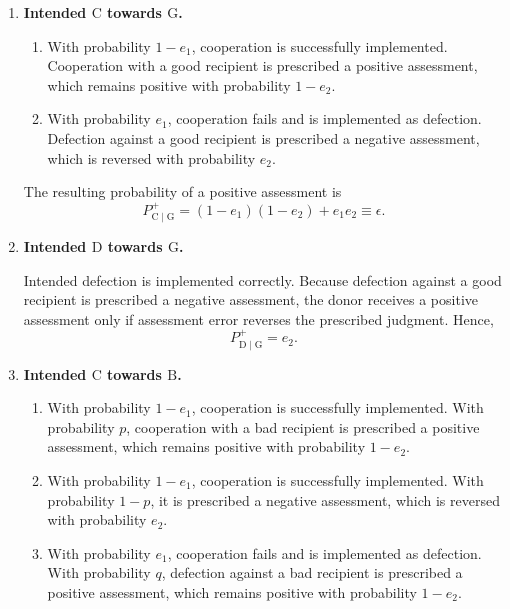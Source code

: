 \documentclass[fleqn,10pt]{wlscirep}
\begin{document}
\begin{enumerate}
\item \textbf{Intended $\mathrm{C}$ towards $\mathrm{G}$.}
\begin{enumerate}
\item With probability $1-e_1$, cooperation is successfully implemented. Cooperation with a good recipient is prescribed a positive assessment, which remains positive with probability $1-e_2$.
\item With probability $e_1$, cooperation fails and is implemented as defection. Defection against a good recipient is prescribed a negative assessment, which is reversed with probability $e_2$.
\end{enumerate}
The resulting probability of a positive assessment is
\begin{equation}
    P^+_{\mathrm{C}\mid\mathrm{G}}=(1-e_1)(1-e_2)+e_1e_2\equiv \epsilon.
\end{equation}

\item \textbf{Intended $\mathrm{D}$ towards $\mathrm{G}$.}

Intended defection is implemented correctly. Because defection against a good recipient is prescribed a negative assessment, the donor receives a positive assessment only if assessment error reverses the prescribed judgment. Hence,
\begin{equation}
    P^+_{\mathrm{D}\mid\mathrm{G}}=e_2.
\end{equation}

\item \textbf{Intended $\mathrm{C}$ towards $\mathrm{B}$.}

\begin{enumerate}
\item With probability $1-e_1$, cooperation is successfully implemented. With probability $p$, cooperation with a bad recipient is prescribed a positive assessment, which remains positive with probability $1-e_2$.

\item With probability $1-e_1$, cooperation is successfully implemented. With probability $1-p$, it is prescribed a negative assessment, which is reversed with probability $e_2$.

\item With probability $e_1$, cooperation fails and is implemented as defection. With probability $q$, defection against a bad recipient is prescribed a positive assessment, which remains positive with probability $1-e_2$.


\end{enumerate}
\end{enumerate}
\end{document}
